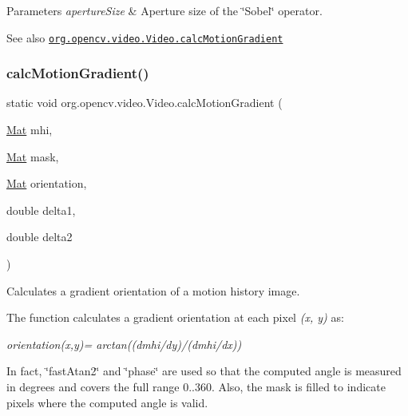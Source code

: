 \begin{DoxyParams}{Parameters}
{\em aperture\+Size} & Aperture size of the \char`\"{}\+Sobel\char`\"{} operator.\\
\hline
\end{DoxyParams}
\begin{DoxySeeAlso}{See also}
\href{http://docs.opencv.org/modules/video/doc/motion_analysis_and_object_tracking.html#calcmotiongradient}{\tt org.\+opencv.\+video.\+Video.\+calc\+Motion\+Gradient} 
\end{DoxySeeAlso}
\mbox{\label{classorg_1_1opencv_1_1video_1_1_video_a71bdf0bf465515f5d89eb2e3e11614b3}} 
\subsubsection{\texorpdfstring{calc\+Motion\+Gradient()}{calcMotionGradient()}\hspace{0.1cm}{\footnotesize\ttfamily [2/2]}}
{\footnotesize\ttfamily static void org.\+opencv.\+video.\+Video.\+calc\+Motion\+Gradient (\begin{DoxyParamCaption}\item[{\mbox{\hyperlink{classorg_1_1opencv_1_1core_1_1_mat}{Mat}}}]{mhi,  }\item[{\mbox{\hyperlink{classorg_1_1opencv_1_1core_1_1_mat}{Mat}}}]{mask,  }\item[{\mbox{\hyperlink{classorg_1_1opencv_1_1core_1_1_mat}{Mat}}}]{orientation,  }\item[{double}]{delta1,  }\item[{double}]{delta2 }\end{DoxyParamCaption})\hspace{0.3cm}{\ttfamily [static]}}

Calculates a gradient orientation of a motion history image.

The function calculates a gradient orientation at each pixel {\itshape (x, y)} as\+:

{\itshape orientation(x,y)= arctan((dmhi/dy)/(dmhi/dx))}

In fact, \char`\"{}fast\+Atan2\char`\"{} and \char`\"{}phase\char`\"{} are used so that the computed angle is measured in degrees and covers the full range 0..360. Also, the {\ttfamily mask} is filled to indicate pixels where the computed angle is valid.

